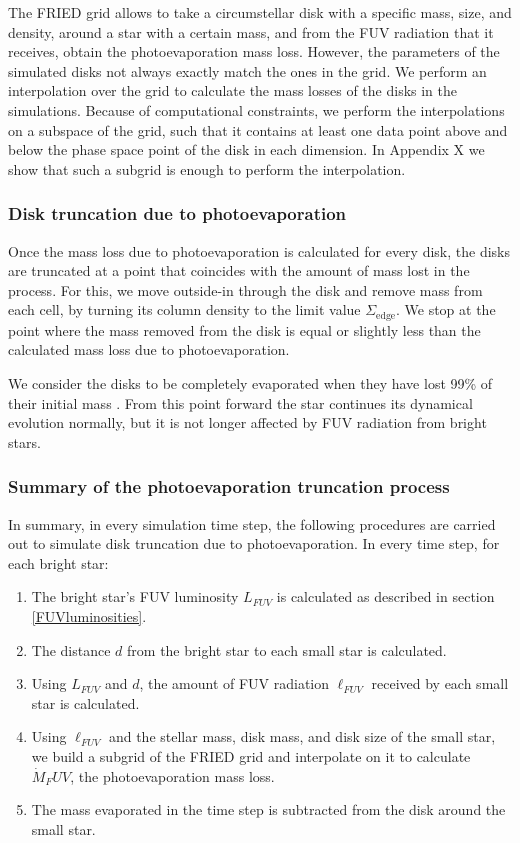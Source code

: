 \documentclass[fleqn,usenatbib]{mnras}
\newcommand\note[1]{{\colorbox{yellow!60}{\color{magenta}#1}}}
\begin{document}
The FRIED grid allows to take a circumstellar disk with a specific mass, size, and density, around a star with a certain mass, and from the FUV radiation that it receives, obtain the photoevaporation mass loss. However, the parameters of the simulated disks not always exactly match the ones in the grid. We perform an interpolation over the grid to calculate the mass losses of the disks in the simulations. Because of computational constraints, we perform the interpolations on a subspace of the grid, such that it contains at least one data point above and below the phase space point of the disk in each dimension. In \note{Appendix X} we show that such a subgrid is enough to perform the interpolation.

\subsubsection{Disk truncation due to photoevaporation}\label{truncations_photoevaporation}
Once the mass loss due to photoevaporation is calculated for every disk, the disks are truncated at a point that coincides with the amount of mass lost in the process. For this, we move outside-in through the disk and remove mass from each cell, by turning its column density to the limit value $\Sigma_{\mathrm{edge}}$. We stop at the point where the mass removed from the disk is equal or slightly less than the calculated mass loss due to photoevaporation. 

We consider the disks to be completely evaporated when they have lost 99\% of their initial mass \citep{anderson2013}. From this point forward the star continues its dynamical evolution normally, but it is not longer affected by FUV radiation from bright stars. 

\subsubsection{Summary of the photoevaporation truncation process}\label{photoevap_summary}
In summary, in every simulation time step, the following procedures are carried out to simulate disk truncation due to photoevaporation. In every time step, for each bright star:

\begin{enumerate}
\item The bright star's FUV luminosity $L_{FUV}$ is calculated as described in section \ref{FUVluminosities}.
\item The distance $d$ from the bright star to each small star is calculated.
\item Using $L_{FUV}$ and $d$, the amount of FUV radiation $\ell_{FUV}$ received by each small star is calculated.
\item Using $\ell_{FUV}$ and the stellar mass, disk mass, and disk size of the small star, we build a subgrid of the FRIED grid and interpolate on it to calculate $\dot{M}_FUV$, the photoevaporation mass loss.
\item The mass evaporated in the time step is subtracted from the disk around the small star.
\end{enumerate}
\end{document}
